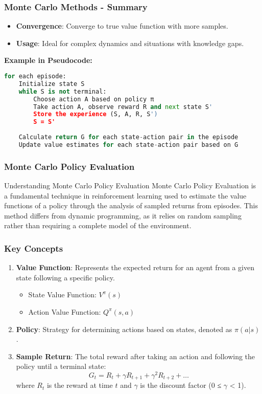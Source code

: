 \documentclass[aspectratio=169]{beamer}
\begin{document}
\begin{frame}[fragile]
    \frametitle{Monte Carlo Methods - Summary}
    \begin{itemize}
        \item \textbf{Convergence}: Converge to true value function with more samples.
        \item \textbf{Usage}: Ideal for complex dynamics and situations with knowledge gaps.
    \end{itemize}
    
    \textbf{Example in Pseudocode:}
    \begin{lstlisting}[language=Python]
for each episode:
    Initialize state S
    while S is not terminal:
        Choose action A based on policy π
        Take action A, observe reward R and next state S'
        Store the experience (S, A, R, S')
        S = S'
    
    Calculate return G for each state-action pair in the episode
    Update value estimates for each state-action pair based on G
    \end{lstlisting}
\end{frame}

\begin{frame}[fragile]
    \frametitle{Monte Carlo Policy Evaluation}
    \begin{block}{Understanding Monte Carlo Policy Evaluation}
        Monte Carlo Policy Evaluation is a fundamental technique in reinforcement learning used to estimate the value functions of a policy through the analysis of sampled returns from episodes. This method differs from dynamic programming, as it relies on random sampling rather than requiring a complete model of the environment.
    \end{block}
\end{frame}

\begin{frame}[fragile]
    \frametitle{Key Concepts}
    \begin{enumerate}
        \item \textbf{Value Function}: Represents the expected return for an agent from a given state following a specific policy.
            \begin{itemize}
                \item State Value Function: \( V^\pi(s) \)
                \item Action Value Function: \( Q^\pi(s, a) \)
            \end{itemize}
        \item \textbf{Policy}: Strategy for determining actions based on states, denoted as \( \pi(a|s) \).
        \item \textbf{Sample Return}: The total reward after taking an action and following the policy until a terminal state:
            \[
            G_t = R_t + \gamma R_{t+1} + \gamma^2 R_{t+2} + \ldots
            \]
            where \( R_t \) is the reward at time \( t \) and \( \gamma \) is the discount factor (0 ≤ \( \gamma \) < 1).
    \end{enumerate}
\end{frame}
\end{document}
